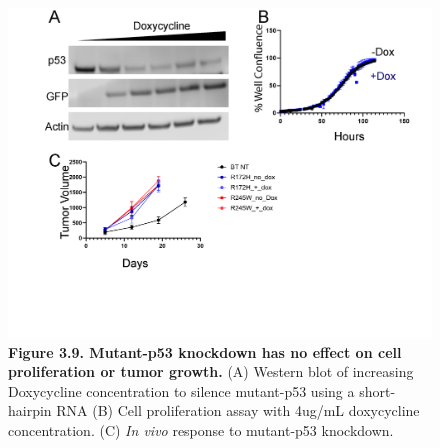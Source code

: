 \begin{figure}
\hypertarget{fig:3.9}{%
\centering
\includegraphics[width=1\textwidth,height=\textheight]{images/shp53.png}
\caption{\textbf{Figure 3.9. Mutant-p53 knockdown has no effect on cell proliferation or tumor growth.} (A) Western blot of increasing Doxycycline concentration to silence mutant-p53 using a short-hairpin RNA (B) Cell proliferation assay with 4ug/mL doxycycline concentration. (C) \emph{In vivo} response to mutant-p53 knockdown.}\label{fig:3.9}
}
\end{figure}

